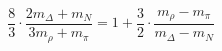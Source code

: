 \begin{equation}
\frac{8}{3}\cdot \frac{2m_{\Delta}+m_N}{3m_{\rho}+m_{\pi}}=1+\frac{3}{2} \cdot \frac{m_\rho-m_\pi}{m_\Delta-m_N}
\end{equation} 

